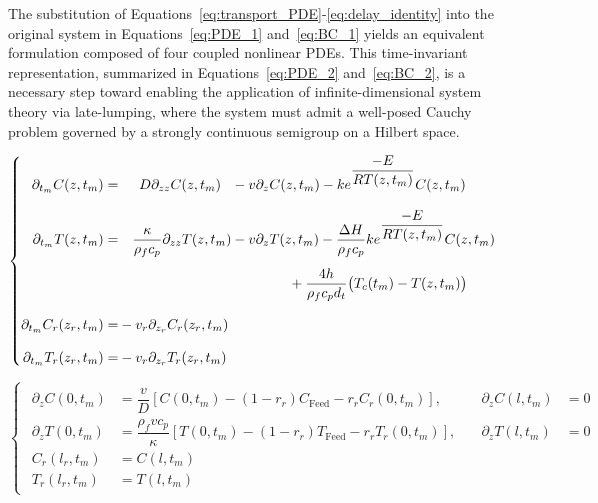 The substitution of Equations~\eqref{eq:transport_PDE}-\eqref{eq:delay_identity} into the original system in Equations~\eqref{eq:PDE_1} and~\eqref{eq:BC_1} yields an equivalent formulation composed of four coupled nonlinear PDEs. This time-invariant representation, summarized in Equations~\eqref{eq:PDE_2} and~\eqref{eq:BC_2}, is a necessary step toward enabling the application of infinite-dimensional system theory via late-lumping, where the system must admit a well-posed Cauchy problem governed by a strongly continuous semigroup on a Hilbert space.


\begin{equation} \label{eq:PDE_2}
\begin{cases}
\begin{alignedat}{2}
    \partial_{t_m} C(z, t_m) = &\hspace{1.5em} D \partial_{zz} C(z, t_m) 
    &&- v \partial_z C(z, t_m) 
    - k e^{\dfrac{-E}{R T(z, t_m)}} C(z, t_m) \\[2.0ex]

    \partial_{t_m} T(z, t_m) = &\hspace{1em}\dfrac{\kappa}{\rho_f c_p} \partial_{zz} T(z, t_m) 
    &&- v \partial_z T(z, t_m)
    - \dfrac{\Delta H}{\rho_f c_p} k e^{\dfrac{-E}{R T(z, t_m)}} C(z, t_m) \\[1.2ex]
    &&& \hspace{4.1em} + \dfrac{4h}{\rho_f c_p d_t} \bigl( T_c(t_m) - T(z, t_m) \bigr) \\[2.0ex]

    \partial_{t_m} C_r(z_r, t_m) = &- v_r \partial_{z_r} C_r(z_r, t_m) \\[2.0ex]

    \partial_{t_m} T_r(z_r, t_m) = &- v_r \partial_{z_r} T_r(z_r, t_m)
\end{alignedat}
\end{cases}
\end{equation}

\begin{equation} \label{eq:BC_2}
\begin{cases}
\begin{alignedat}{2}
    \partial_z C(0, t_m) &= \dfrac{v}{D} \left[ C(0, t_m) - (1 - r_r) C_\text{Feed} - r_r C_r(0, t_m) \right], \quad &\partial_z C(l, t_m) &= 0 \\[1.5ex]

    \partial_z T(0, t_m) &= \dfrac{\rho_f v c_p}{\kappa} \left[ T(0, t_m) - (1 - r_r) T_\text{Feed} - r_r T_r(0, t_m) \right], \quad &\partial_z T(l, t_m) &= 0 \\[1.5ex]

    C_r(l_r, t_m) &= C(l, t_m) \\[1.5ex]
    T_r(l_r, t_m) &= T(l, t_m)
\end{alignedat}
\end{cases}
\end{equation}

